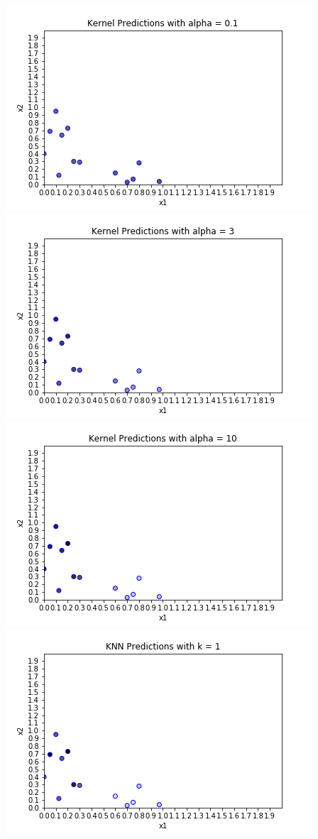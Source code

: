 \documentclass[submit]{harvardml}
\begin{document}
\begin{enumerate}
\includegraphics[scale=.5]{Kernel Predictions with alpha = 0.1.png}
\includegraphics[scale=.5]{Kernel Predictions with alpha = 3.png}\\
\includegraphics[scale=.5]{Kernel Predictions with alpha = 10.png}
\includegraphics[scale=.5]{KNN Predictions with k = 1.png}\\

\end{enumerate}
\end{document}
